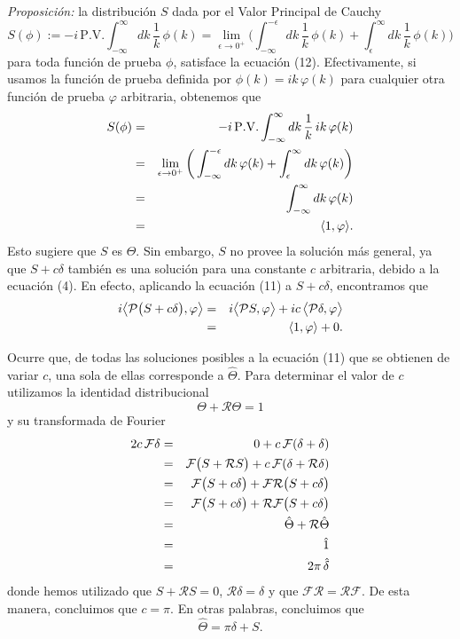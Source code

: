\documentclass[11pt,spanish]{article}
\newcommand{\four}{\mathcal{F}}
\newcommand{\refl}{\mathcal{R}}
\newcommand{\powr}{\mathcal{P}}
\begin{document}
{\em Proposici\'on:}
la distribuci\'on $S$ dada por el Valor Principal de Cauchy
$$
S(\phi)
:=
-i\,
\mathrm{P.V.}
\int_{-\infty}^{\infty}
dk\,
\frac{1}{k}\,
\phi(k)
=
\lim_{\epsilon\to 0^+}
\bigg(
\int_{-\infty}^{-\epsilon}
dk\,
\frac{1}{k}\,
\phi(k)
+
\int_{\epsilon}^{\infty}
dk\,
\frac{1}{k}\,
\phi(k)
\bigg)
$$
para toda funci\'on de prueba $\phi$, satisface la ecuaci\'on (12).
Efectivamente, si usamos la funci\'on de prueba definida por $\phi(k) = ik\,\varphi(k)$ para cualquier otra funci\'on de prueba $\varphi$ arbitraria, obtenemos que
\begin{eqnarray}
S(\phi)
&=&
-i\,
\mathrm{P.V.}
\int_{-\infty}^{\infty}
dk\,
\frac{1}{k}\,
ik\,\varphi(k)
\notag
\\
&=&
\lim_{\epsilon\to 0^+}
\bigg(
\int_{-\infty}^{-\epsilon}
dk\,
\varphi(k)
+
\int_{\epsilon}^{\infty}
dk\,
\varphi(k)
\bigg)
\notag
\\
&=&
\int_{-\infty}^{\infty}
dk\,
\varphi(k)
\notag
\\
&=&
\langle 1,\varphi \rangle.
\notag
\end{eqnarray}
Esto sugiere que $S$ es $\hat{\Theta}$.
Sin embargo, $S$ no provee la soluci\'on m\'as general, ya que $S + c\delta$ tambi\'en es una soluci\'on para una constante $c$ arbitraria, debido a la ecuaci\'on (4).
En efecto, aplicando la ecuaci\'on (11) a $S+c\delta$, encontramos que
\begin{eqnarray}
i
\big\langle 
\powr
\big(
S
+
c
\delta
\big)
,
\varphi
\big\rangle
&=&
i
\big\langle 
\powr
S
,
\varphi
\big\rangle
+
ic\,
\big\langle 
\powr
\delta
,
\varphi
\big\rangle
\notag
\\
&=&
\langle 
1,
\varphi
\rangle
+
0.
\notag
\end{eqnarray}

Ocurre que, de todas las soluciones posibles a la ecuaci\'on (11) que se obtienen de variar $c$, una sola de ellas corresponde a $\hat{\Theta}$.
Para determinar el valor de $c$ utilizamos la identidad distribucional
$$
\Theta
+
\refl \Theta = 1
$$
y su transformada de Fourier
\begin{eqnarray}
2c\,\four \delta
&=&
0
+
c\,\four (\delta + \delta)
\notag
\\
&=&
\four
\big(
S
+
\refl S
\big)
+
c\,\four (\delta + \refl \delta)
\notag
\\
&=&
\four 
\big(
S
+
c \delta
\big)
+
\four 
\refl
\big(
S
+
c\delta
\big)
\notag
\\
&=&
\four 
\big(
S
+
c \delta
\big)
+
\refl
\four 
\big(
S
+
c\delta
\big)
\notag
\\
&=&
\hat{\Theta}
+
\refl \hat{\Theta} 
\notag
\\
&=&
\hat{1} 
\notag
\\
&=&
2\pi\,\hat{\delta}
\notag
\end{eqnarray}
donde hemos utilizado que 
$S + \refl S=0$, $\refl \delta=\delta$ y que
$\four \refl = \refl \four$.
De esta manera, concluimos que $c=\pi$.
En otras palabras, concluimos que
$$
\hat{\Theta}
=
\pi \delta
+
S.
$$
\end{document}
